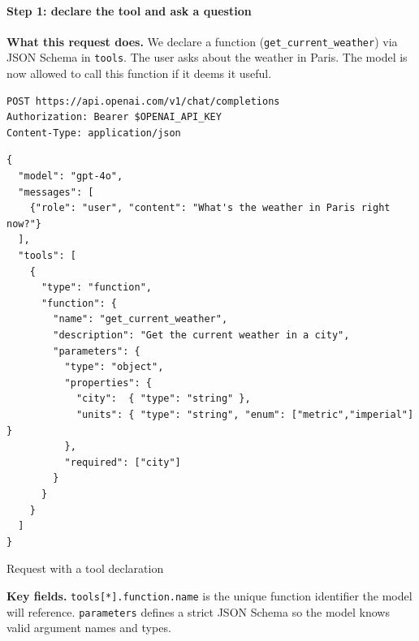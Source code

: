 \documentclass[english]{article}
\begin{document}
\paragraph{Step 1: declare the tool and ask a question}

\noindent\textbf{What this request does.}
We declare a function (\texttt{get\_current\_weather}) via JSON Schema in \texttt{tools}. The user asks about the weather in Paris. The model is now allowed to call this function if it deems it useful.

\begin{listing}[H]
\begin{verbatim}
POST https://api.openai.com/v1/chat/completions
Authorization: Bearer $OPENAI_API_KEY
Content-Type: application/json
\end{verbatim}
\begin{verbatim}
{
  "model": "gpt-4o",
  "messages": [
    {"role": "user", "content": "What's the weather in Paris right now?"}
  ],
  "tools": [
    {
      "type": "function",
      "function": {
        "name": "get_current_weather",
        "description": "Get the current weather in a city",
        "parameters": {
          "type": "object",
          "properties": {
            "city":  { "type": "string" },
            "units": { "type": "string", "enum": ["metric","imperial"] }
          },
          "required": ["city"]
        }
      }
    }
  ]
}
\end{verbatim}
\caption{Request with a tool declaration}
\end{listing}

\noindent\textbf{Key fields.}
\texttt{tools[*].function.name} is the unique function identifier the model will reference. \texttt{parameters} defines a strict JSON Schema so the model knows valid argument names and types.
\end{document}
